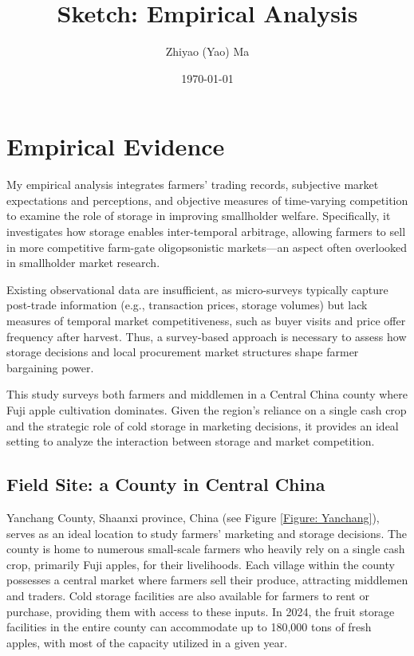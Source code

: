 \documentclass[12pt]{article}
\title{Sketch: Empirical Analysis}
\author{Zhiyao (Yao) Ma}
\date{\today}
\begin{document}
\maketitle

\section{Empirical Evidence}

\noindent My empirical analysis integrates farmers' trading records, subjective market expectations and perceptions, and objective measures of time-varying competition to examine the role of storage in improving smallholder welfare. Specifically, it investigates how storage enables inter-temporal arbitrage, allowing farmers to sell in more competitive farm-gate oligopsonistic markets—an aspect often overlooked in smallholder market research.

Existing observational data are insufficient, as micro-surveys typically capture post-trade information (e.g., transaction prices, storage volumes) but lack measures of temporal market competitiveness, such as buyer visits and price offer frequency after harvest. Thus, a survey-based approach is necessary to assess how storage decisions and local procurement market structures shape farmer bargaining power.

This study surveys both farmers and middlemen in a Central China county where Fuji apple cultivation dominates. Given the region's reliance on a single cash crop and the strategic role of cold storage in marketing decisions, it provides an ideal setting to analyze the interaction between storage and market competition.


\subsection{Field Site: a County in Central China}
\noindent Yanchang County, Shaanxi province, China (see Figure \ref{Figure: Yanchang}), serves as an ideal location to study farmers' marketing and storage decisions. The county is home to numerous small-scale farmers who heavily rely on a single cash crop, primarily Fuji apples, for their livelihoods. Each village within the county possesses a central market where farmers sell their produce, attracting middlemen and traders. Cold storage facilities are also available for farmers to rent or purchase, providing them with access to these inputs. In 2024, the fruit storage facilities in the entire county can accommodate up to 180,000 tons of fresh apples, with most of the capacity utilized in a given year.
\end{document}
